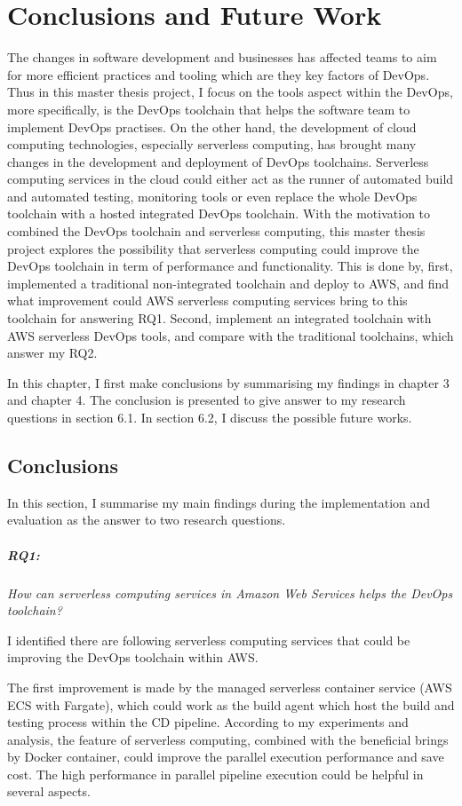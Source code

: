\chapter{Conclusions and Future Work}
\label{chp:conclusionsandfuturework}
The changes in software development and businesses has affected teams to aim for more efficient practices and tooling which are they key factors of DevOps. Thus in this master thesis project, I focus on the tools aspect within the DevOps, more specifically, is the DevOps toolchain that helps the software team to implement DevOps practises. On the other hand, the development of cloud computing technologies, especially serverless computing, has brought many changes in the development and deployment of DevOps toolchains. Serverless computing services in the cloud could either act as the runner of automated build and automated testing, monitoring tools or even replace the whole DevOps toolchain with a hosted integrated DevOps toolchain. With the motivation to combined the DevOps toolchain and serverless computing, this master thesis project explores the possibility that serverless computing could improve the DevOps toolchain in term of performance and functionality. 
This is done by, first, implemented a traditional non-integrated toolchain and deploy to AWS, and find what improvement could AWS serverless computing services bring to this toolchain for answering RQ1. Second, implement an integrated toolchain with AWS serverless DevOps tools, and compare with the traditional toolchains, which answer my RQ2. 

In this chapter, I first make conclusions by summarising my findings in chapter 3 and chapter 4. The conclusion is presented to give answer to my research questions in section 6.1. In section 6.2, I discuss the possible future works.
\section{Conclusions}
In this section, I summarise my main findings during the implementation and evaluation as the answer to two research questions.
\paragraph{RQ1:} \textit{How can serverless computing services in Amazon Web Services helps the DevOps toolchain?}
\medskip
\par
I identified there are following serverless computing services that could be improving the DevOps toolchain within AWS.
\par
The first improvement is made by the managed serverless container service (AWS ECS with Fargate), which could work as the build agent which host the build and testing process within the CD pipeline. According to my experiments and analysis, the feature of serverless computing, combined with the beneficial brings by Docker container, could improve the parallel execution performance and save cost. The high performance in parallel pipeline execution could be helpful in several aspects. 

